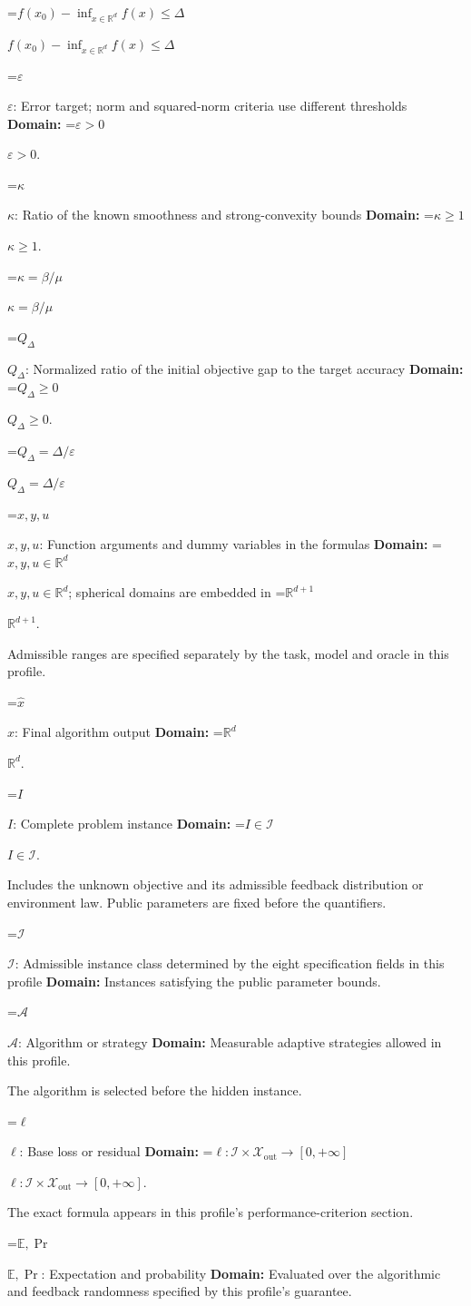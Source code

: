 \documentclass[10pt,a4paper]{article}
\newcommand{\AtlasMath}[1]{\par\begingroup\centering\setbox0=\hbox{$\displaystyle #1$}\ifdim\wd0>1.4\linewidth\typeout{ATLAS WIDE FORMULA: \the\wd0}\fi\ifdim\wd0>\linewidth\resizebox{\linewidth}{!}{\box0}\else\box0\fi\par\endgroup}
\newcommand{\AtlasInlineMath}[1]{\begingroup\setbox0=\hbox{$#1$}\ifdim\wd0>.4\linewidth\endgroup\AtlasMath{#1}\else\endgroup$#1$\fi}
\begin{document}
\AtlasInlineMath{f(x_0)-\inf_{x\in\mathbb{R}^d}f(x)\le\Delta}

\AtlasInlineMath{\varepsilon}: Error target; norm and squared-norm criteria use different thresholds \textbf{Domain:} \AtlasInlineMath{\varepsilon>0}.

\AtlasInlineMath{\kappa}: Ratio of the known smoothness and strong-convexity bounds \textbf{Domain:} \AtlasInlineMath{\kappa\ge1}.

\AtlasInlineMath{\kappa=\beta/\mu}

\AtlasInlineMath{Q_\Delta}: Normalized ratio of the initial objective gap to the target accuracy \textbf{Domain:} \AtlasInlineMath{Q_\Delta\ge0}.

\AtlasInlineMath{Q_\Delta=\Delta/\varepsilon}

\AtlasInlineMath{x,y,u}: Function arguments and dummy variables in the formulas \textbf{Domain:} \AtlasInlineMath{x,y,u\in\mathbb{R}^d}; spherical domains are embedded in \AtlasInlineMath{\mathbb{R}^{d+1}}.

Admissible ranges are specified separately by the task, model and oracle in this profile.

\AtlasInlineMath{\widehat{x}}: Final algorithm output \textbf{Domain:} \AtlasInlineMath{\mathbb{R}^d}.

\AtlasInlineMath{I}: Complete problem instance \textbf{Domain:} \AtlasInlineMath{I\in\mathcal{I}}.

Includes the unknown objective and its admissible feedback distribution or environment law. Public parameters are fixed before the quantifiers.

\AtlasInlineMath{\mathcal{I}}: Admissible instance class determined by the eight specification fields in this profile \textbf{Domain:} Instances satisfying the public parameter bounds.

\AtlasInlineMath{\mathcal{A}}: Algorithm or strategy \textbf{Domain:} Measurable adaptive strategies allowed in this profile.

The algorithm is selected before the hidden instance.

\AtlasInlineMath{\ell}: Base loss or residual \textbf{Domain:} \AtlasInlineMath{\ell:\mathcal{I}\times\mathcal{X}_{\mathrm{out}}\to[0,+\infty]}.

The exact formula appears in this profile's performance-criterion section.

\AtlasInlineMath{\mathbb{E},\Pr}: Expectation and probability \textbf{Domain:} Evaluated over the algorithmic and feedback randomness specified by this profile's guarantee.
\end{document}
